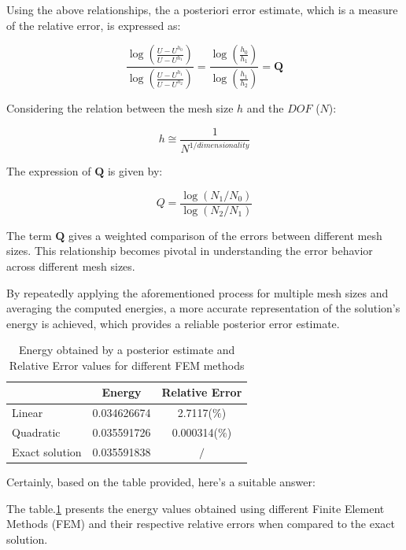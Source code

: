 \documentclass[twoside,twocolumn,10pt]{article}
\begin{document}
Using the above relationships, the a posteriori error estimate, which is a measure of the relative error, is expressed as:

\begin{equation}
\frac{\log \left( \frac{U-U^{h_0}}{U-U^{h_1}} \right)}{\log \left( \frac{U-U^{h_1}}{U-U^{h_2}} \right)} = \frac{\log \left( \frac{h_0}{h_1} \right)}{\log \left( \frac{h_1}{h_2} \right)} = \textbf{Q}
\label{eq:Q_relation}
\end{equation}

Considering the relation between the mesh size $h$ and the $DOF$ ($N$):

\begin{equation}
 h \cong \frac{1}{N^{1 / dimensionality}}
\end{equation}

The expression of $\textbf{Q}$ is given by:

\begin{equation}
  Q=\frac{\log \left(N_1 / N_0\right)}{\log \left(N_2 / N_1\right)}
\end{equation}

The term \( \textbf{Q} \) gives a weighted comparison of the errors between different mesh sizes. This relationship becomes pivotal in understanding the error behavior across different mesh sizes.

By repeatedly applying the aforementioned process for multiple mesh sizes and averaging the computed energies, a more accurate representation of the solution's energy is achieved, which provides a reliable posterior error estimate.

\begin{table}[h]
  \centering
  \begin{tabular}{|l|c|c|}
      \hline
      & \textbf{Energy} & \textbf{Relative Error} \\
      \hline
      Linear & 0.034626674 & 2.7117($\%$) \\
      \hline
      Quadratic & 0.035591726 & 0.000314($\%$) \\
      \hline
      Exact solution & 0.035591838 & $/$ \\
      \hline
  \end{tabular}
  \caption{Energy obtained by a posterior estimate and Relative Error values for different FEM methods}
  \label{tab:fem_values}
\end{table}
Certainly, based on the table provided, here's a suitable answer:

The table.\ref{tab:fem_values} presents the energy values obtained using different Finite Element Methods (FEM) and their respective relative errors when compared to the exact solution. 
\end{document}
